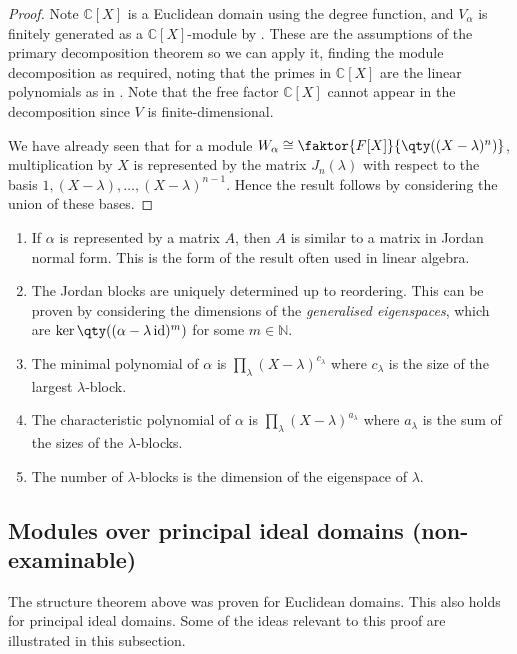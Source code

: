 \begin{proof}
	Note $\mathbb C[X]$ is a Euclidean domain using the degree function, and $V_\alpha$ is finitely generated as a $\mathbb C[X]$-module by .
	These are the assumptions of the primary decomposition theorem so we can apply it, finding the module decomposition as required, noting that the primes in $\mathbb C[X]$ are the linear polynomials as in .
	Note that the free factor $\mathbb C[X]$ cannot appear in the decomposition since $V$ is finite-dimensional.

	We have already seen that for a module $W_\alpha \cong \faktor{F[X]}{\qty((X-\lambda)^n)}$, multiplication by $X$ is represented by the matrix $J_n(\lambda)$ with respect to the basis $1, (X-\lambda), \dots, (X-\lambda)^{n-1}$.
	Hence the result follows by considering the union of these bases.
\end{proof}

\begin{remark}
	\begin{enumerate}
		\item If $\alpha$ is represented by a matrix $A$, then $A$ is similar to a matrix in Jordan normal form.
		This is the form of the result often used in linear algebra.
		\item The Jordan blocks are uniquely determined up to reordering.
		This can be proven by considering the dimensions of the \textit{generalised eigenspaces}, which are $\ker\qty((\alpha - \lambda \id)^m)$ for some $m \in \mathbb N$.
		\item The minimal polynomial of $\alpha$ is $\prod_{\lambda} (X-\lambda)^{c_\lambda}$ where $c_\lambda$ is the size of the largest $\lambda$-block.
		\item The characteristic polynomial of $\alpha$ is $\prod_{\lambda} (X-\lambda)^{a_\lambda}$ where $a_\lambda$ is the sum of the sizes of the $\lambda$-blocks.
		\item The number of $\lambda$-blocks is the dimension of the eigenspace of $\lambda$.
	\end{enumerate} 
\end{remark}

\subsection{Modules over principal ideal domains (non-examinable)}
The structure theorem above was proven for Euclidean domains.
This also holds for principal ideal domains.
Some of the ideas relevant to this proof are illustrated in this subsection.

